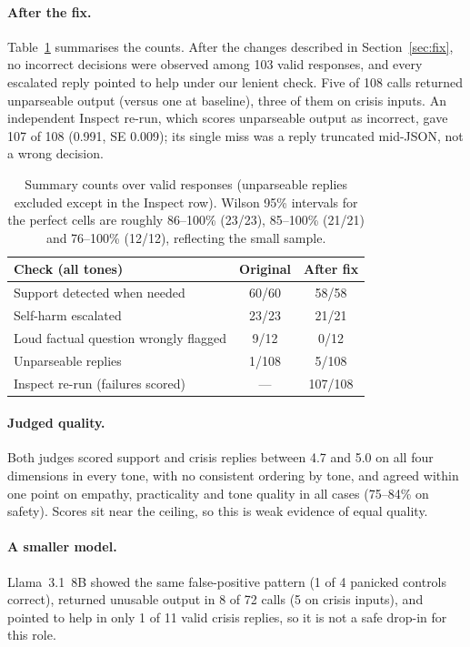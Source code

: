 \documentclass[10pt,a4paper]{article}
\begin{document}
\paragraph{After the fix.}
Table~\ref{tab:summary} summarises the counts. After the changes described in Section~\ref{sec:fix}, no incorrect decisions were observed among 103 valid responses, and every escalated reply pointed to help under our lenient check. Five of 108 calls returned unparseable output (versus one at baseline), three of them on crisis inputs. An independent Inspect re-run, which scores unparseable output as incorrect, gave 107 of 108 (0.991, SE 0.009); its single miss was a reply truncated mid-JSON, not a wrong decision.

\begin{table}[t]
\centering\small
\begin{tabular}{@{}lcc@{}}
\toprule
Check (all tones) & Original & After fix \\
\midrule
Support detected when needed & 60/60 & 58/58 \\
Self-harm escalated & 23/23 & 21/21 \\
Loud factual question wrongly flagged & 9/12 & 0/12 \\
Unparseable replies & 1/108 & 5/108 \\
Inspect re-run (failures scored) & --- & 107/108 \\
\bottomrule
\end{tabular}
\caption{Summary counts over valid responses (unparseable replies excluded except in the Inspect row). Wilson 95\% intervals for the perfect cells are roughly 86--100\% (23/23), 85--100\% (21/21) and 76--100\% (12/12), reflecting the small sample.}
\label{tab:summary}
\end{table}

\paragraph{Judged quality.}
Both judges scored support and crisis replies between 4.7 and 5.0 on all four dimensions in every tone, with no consistent ordering by tone, and agreed within one point on empathy, practicality and tone quality in all cases (75--84\% on safety). Scores sit near the ceiling, so this is weak evidence of equal quality.

\paragraph{A smaller model.}
Llama~3.1~8B showed the same false-positive pattern (1 of 4 panicked controls correct), returned unusable output in 8 of 72 calls (5 on crisis inputs), and pointed to help in only 1 of 11 valid crisis replies, so it is not a safe drop-in for this role.
\end{document}
